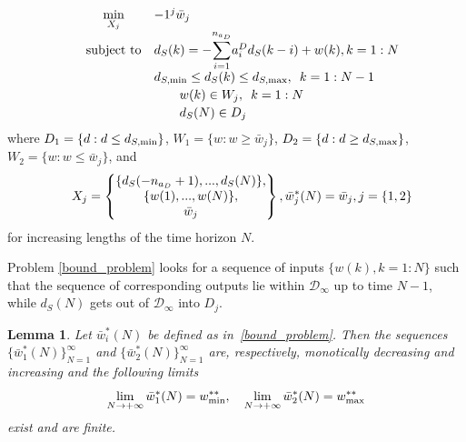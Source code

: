 \documentclass[letterpaper, 10 pt, conference]{ieeeconf}  %
\newtheorem{lemma}{Lemma}
\newcommand{\AB}[1]{\textbf{\color{magenta}{[AB: #1]}}}
\newcommand{\SK}[1]{\textbf{\color{blue}{[SK: #1]}}}
\begin{document}
		\begin{equation}
		\small
		\label{bound_problem}
		\begin{array}{rcll}
		&\underset{X_{j}}{\text{min}}& -1^j\bar{w}_j \\
		&\text{subject to} &d_S(k) = -\mathlarger{\sum\limits_{i=1}^{n_{a_D}}}a_i^Dd_S(k-i) + w(k), k={1:N}\\[.2em]
		&&d_{S,{\rm min}} \leq d_S(k) \leq d_{S,{\rm max}}, \hspace{5pt} k={1:N-1}\\[.2em]
		&& \hspace{20pt}   w(k) \in W_j, \hspace{5pt} k={1:N}\\[.2em]
		&& \hspace{20pt}  d_S(N) \in D_j 
		\end{array}
		\end{equation}
	\normalsize
where $D_1 = \{d:d \leq d_{S,{\rm min}}\}$, $W_1 = \{w:w \geq \bar{w}_j\}$, $D_2 = \{d:d \geq d_{S,{\rm max}}\}$, $W_2 = \{w:w \leq \bar{w}_j\}$,
and
\begin{equation*}
\small 
X_j = 
	\begin{Bmatrix}
	\{d_S(-n_{a_D}+1),...,d_S(N)\},\\
	\{w(1),...,w(N)\},\vspace{0.001cm}\\
	\bar{w}_j
	\end{Bmatrix}, \bar{w}_j^*(N) = \bar{w}_j, j=\{1,2\}
	\begin{matrix} 
	\end{matrix}
\end{equation*}
\normalsize
for increasing lengths of the time horizon $N$.

Problem \eqref{bound_problem} looks for a sequence of inputs $\{w(k), k={1:N}\}$ such that the sequence of corresponding outputs lie within $\mathcal{D}_{\infty}$
up to time $N-1$, while $d_S(N)$ gets out of $\mathcal{D}_{\infty}$ into $D_j$. 
\begin{lemma}
Let $\bar w_i^*(N)$ be defined as in~\eqref{bound_problem}. Then
the sequences $\{\bar w_1^*(N)\}_{N=1}^{\infty}$ and
$\{\bar w_2^*(N)\}_{N=1}^{\infty}$ are, respectively,
monotically decreasing and increasing and the following limits 
\[
    \lim_{N\rightarrow+\infty}\bar w_1^*(N)=w^{**}_{\rm min},\quad    \lim_{N\rightarrow+\infty}\bar w_2^*(N)=w^{**}_{\rm max}
\]
exist and are finite. 
\end{lemma}
\end{document}
